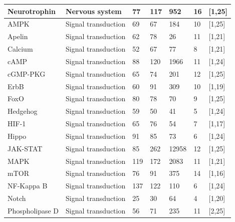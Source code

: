 \begin{table}[H]
\begin{adjustbox}{center}
\begin{tabular}{|l|l|l|l|l|l|l|}
Neurotrophin            & Nervous system                  & 77   & 117 & 952   & 16 & {[}1,25{]}  \\\hline       
AMPK                    & Signal transduction             & 69   & 67  & 184   & 10 & {[}1,25{]}  \\      
Apelin                  & Signal transduction             & 62   & 78  & 26    & 11 & {[}1,21{]}  \\   
Calcium                 & Signal transduction             & 52   & 67  & 77    & 8  & {[}1,21{]}  \\                  
cAMP                    & Signal transduction             & 88   & 120 & 1966  & 11 & {[}1,24{]}  \\    
cGMP-PKG                & Signal transduction             & 65   & 74  & 201   & 12 & {[}1,25{]}  \\     
ErbB                    & Signal transduction             & 60   & 91  & 309   & 10 & {[}1,19{]}  \\          
FoxO                    & Signal transduction             & 80   & 78  & 70    & 9  & {[}1,25{]}  \\   
Hedgehog                & Signal transduction             & 59   & 50  & 41    & 5  & {[}1,24{]}  \\         
HIF-1                   & Signal transduction             & 65   & 76  & 54    & 7  & {[}1,17{]}  \\     
Hippo                   & Signal transduction             & 91   & 85  & 73    & 6  & {[}1,24{]}  \\     
JAK-STAT                & Signal transduction             & 85   & 262 & 12958 & 12 & {[}1,25{]}  \\        
MAPK                    & Signal transduction             & 119  & 172 & 2083  & 11 & {[}1,21{]}  \\      
mTOR                    & Signal transduction             & 76   & 91  & 375   & 14 & {[}1,16{]}  \\    
NF-Kappa B              & Signal transduction             & 137  & 122 & 110   & 6  & {[}1,24{]}  \\    
Notch                   & Signal transduction             & 25   & 30  & 64    & 4  & {[}1,20{]}  \\          
Phospholipase D         & Signal transduction             & 56   & 71  & 235   & 11 & {[}2,25{]}  \\\hline   
\end{tabular}
\end{adjustbox}
\end{table}\newpage

